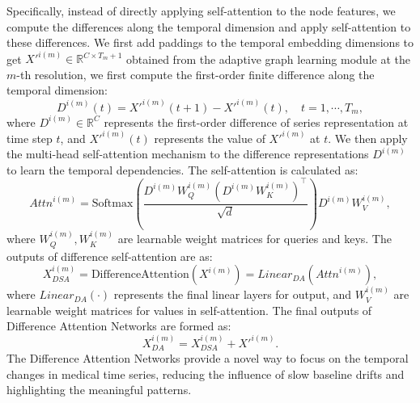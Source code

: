Specifically, instead of directly applying self-attention to the node features, we compute the differences along the temporal dimension and apply self-attention to these differences.
We first add paddings to the temporal embedding dimensions to get ${X'}^{i(m)} \in \mathbb{R}^{C \times T_m+1}$ obtained from the adaptive graph learning module at the $m$-th resolution, we first compute the first-order finite difference along the temporal dimension:
\begin{equation}
{D}^{i(m)}{(t)} = {X'}^{i(m)}{(t+1)} - {X'}^{i(m)}{(t)}, \quad t = 1, \cdots, T_m,
\end{equation}
where ${D}^{i(m)} \in \mathbb{R}^{C}$ represents the first-order difference of series representation at time step $t$, and ${X'}^{i(m)}{(t)}$ represents the value of ${X'}^{i(m)}$ at $t$.
We then apply the multi-head self-attention mechanism to the difference representations ${D}^{i(m)}$ to learn the temporal dependencies. The self-attention is calculated as:
\begin{equation}
{Attn}^{i(m)} = \text{Softmax}\left(\frac{ {D}^{i(m)} W ^{i(m)}_Q ( {D}^{i(m)} W ^{i(m)}_K )^{\top}}{\sqrt{d}}\right) {D}^{i(m)} W ^{i(m)}_V, 
\end{equation}
where $W^{i(m)}_Q, W^{i(m)}_K$ are learnable weight matrices for queries and keys.
The outputs of difference self-attention are as:
\begin{equation}
 {X}^{i(m)}_{DSA} = \text{DifferenceAttention}({X}^{i(m)}) =  Linear_{DA}( {Attn}^{i(m)}  ),
\end{equation}
where $Linear_{DA}(\cdot)$ represents the final linear layers for output, and $W^{i(m)}_V$ are learnable weight matrices for values in self-attention.
The final outputs of Difference Attention Networks are formed as:
\begin{equation}
    {X}^{i(m)}_{DA} = {X}^{i(m)}_{DSA} + {X'}^{i(m)}.
\end{equation}
The Difference Attention Networks provide a novel way to focus on the temporal changes in medical time series, reducing the influence of slow baseline drifts and highlighting the meaningful patterns. 

